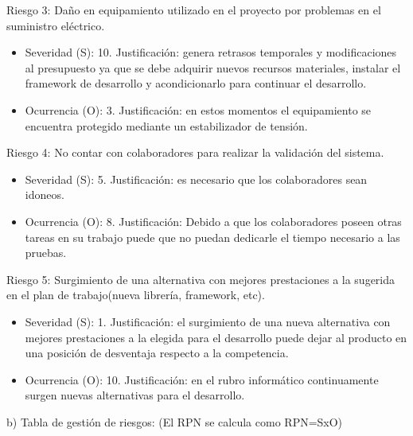 \documentclass[
11pt, %
]{charter}
\begin{document}
Riesgo 3: Daño en equipamiento utilizado en el proyecto por problemas en el suministro eléctrico.
\begin{itemize}
	\item Severidad (S): 10.\newline 
	Justificación: genera retrasos temporales y modificaciones al presupuesto ya que se debe adquirir nuevos recursos materiales, instalar el framework de desarrollo y acondicionarlo para continuar el desarrollo.
	\item Ocurrencia (O): 3.\newline 
	Justificación: en estos momentos el equipamiento se encuentra protegido mediante un estabilizador de tensión.
\end{itemize}	
Riesgo 4: No contar con colaboradores para realizar la validación del sistema.
\begin{itemize}
	\item Severidad (S): 5.\newline 
	Justificación: es necesario que los colaboradores sean idoneos.
	\item Ocurrencia (O): 8.\newline 
	Justificación: Debido a que los colaboradores poseen otras tareas en su trabajo puede que no puedan dedicarle el tiempo necesario a las pruebas.
\end{itemize}
Riesgo 5: Surgimiento de una alternativa con mejores prestaciones a la sugerida en el plan de trabajo(nueva librería, framework, etc).
\begin{itemize}
	\item Severidad (S): 1.\newline 
	Justificación: el surgimiento de una nueva alternativa con mejores prestaciones a la elegida para el desarrollo puede dejar al producto en una posición de desventaja respecto a la competencia.
	\item Ocurrencia (O): 10.\newline 
	Justificación: en el rubro informático continuamente surgen nuevas alternativas para el desarrollo. 	
		 
	
\end{itemize}


b) Tabla de gestión de riesgos:      (El RPN se calcula como RPN=SxO)
\end{document}
